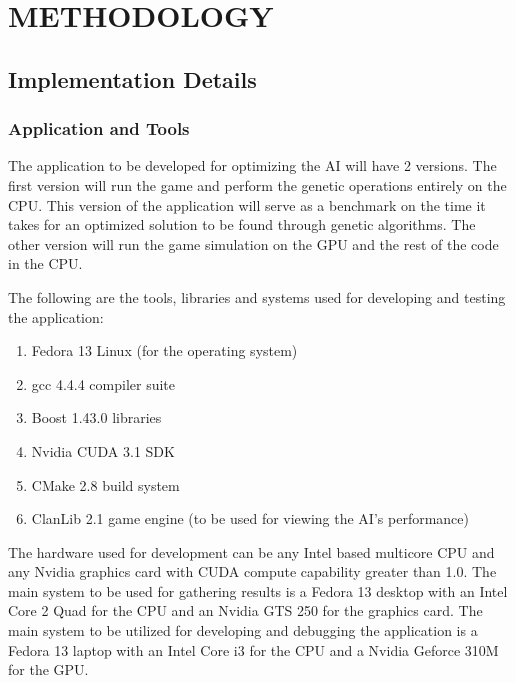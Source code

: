 \chapter{METHODOLOGY}
%
%
\section{Implementation Details}

\subsection{Application and Tools}
The application to be developed for optimizing the AI will have 2 versions.
The first version will run the game and perform the genetic operations entirely
on the CPU. This version of the application will serve as a benchmark on the
time it takes for an optimized solution to be found through genetic algorithms.
The other version will run the game simulation on the GPU and the rest of the
code in the CPU.


The following are the tools, libraries and systems used for developing and testing
the application:

\begin{enumerate}
  \item Fedora 13 Linux (for the operating system)
  \item gcc 4.4.4 compiler suite
  \item Boost 1.43.0 libraries
  \item Nvidia CUDA 3.1 SDK
  \item CMake 2.8 build system
  \item ClanLib 2.1 game engine (to be used for viewing the AI's performance)
\end{enumerate}

The hardware used for development can be any Intel based multicore CPU and any Nvidia
graphics card with CUDA compute capability greater than 1.0. The main system to be
used for gathering results is a Fedora 13 desktop with an Intel Core 2 Quad for the
CPU and an Nvidia GTS 250 for the graphics card. The main system to be utilized for
developing and debugging the application is a Fedora 13 laptop with an Intel
Core i3 for the CPU and a Nvidia Geforce 310M for the GPU.


